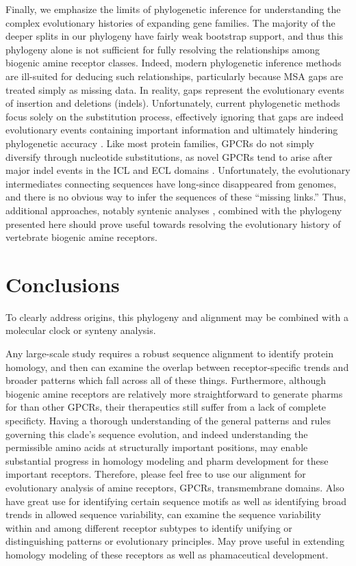\documentclass[fleqn,10pt]{wlpeerj}
\begin{document}
Finally, we emphasize the limits of phylogenetic inference for understanding the complex evolutionary histories of expanding gene families. The majority of the deeper splits in our phylogeny have fairly weak bootstrap support, and thus this phylogeny alone is not sufficient for fully resolving the relationships among biogenic amine receptor classes. Indeed, modern phylogenetic inference methods are ill-suited for deducing such relationships, particularly because MSA gaps are treated simply as missing data. In reality, gaps represent the evolutionary events of insertion and deletions (indels). Unfortunately, current phylogenetic methods focus solely on the substitution process, effectively ignoring that gaps are indeed evolutionary events containing important information and ultimately hindering phylogenetic accuracy \cite{Morrison2008,Loytynoja2008,Warnow2012,Luanetal2013}. Like most protein families, GPCRs do not simply diversify through nucleotide substitutions, as novel GPCRs tend to arise after major indel events in the ICL and ECL domains \citep{BockaertPin1999}. Unfortunately, the evolutionary intermediates connecting sequences have long-since disappeared from genomes, and there is no obvious way to infer the sequences of these ``missing links.'' Thus, additional approaches, notably syntenic analyses \citep{Sundstrom2010,Widmark2011,YegorovGood2012,Hwangetal2013}, combined with the phylogeny presented here should prove useful towards resolving the evolutionary history of vertebrate biogenic amine receptors. 

\section*{Conclusions}


To clearly address origins, this phylogeny and alignment may be combined with a molecular clock or synteny analysis.

Any large-scale study requires a robust sequence alignment to identify protein homology, and then can examine the overlap between receptor-specific trends and broader patterns which fall across all of these things. Furthermore, although biogenic amine receptors are relatively more straightforward to generate pharms for than other GPCRs, their therapeutics still suffer from a lack of complete specificty. Having a thorough understanding of the general patterns and rules governing this clade's sequence evolution, and indeed understanding the permissible amino acids at structurally important positions, may enable substantial progress in homology modeling and pharm development for these important receptors.
Therefore, please feel free to use our alignment for evolutionary analysis of amine receptors, GPCRs, transmembrane domains. Also have great use for identifying certain sequence motifs as well as identifying broad trends in allowed sequence variability, can examine the sequence variability within and among different receptor subtypes to identify unifying or distinguishing patterns or evolutionary principles. May prove useful in extending homology modeling of these receptors as well as phamaceutical development. 
\end{document}
